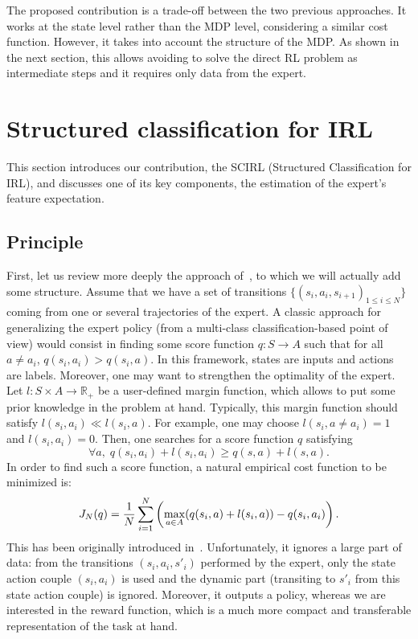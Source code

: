 \documentclass{article}
\begin{document}
The proposed contribution is a trade-off between the two previous
approaches. It works at the state level rather than the MDP level,
considering a similar cost function. However, it takes into account
the structure of the MDP. As shown in the next section, this allows
avoiding to solve the direct RL problem as intermediate steps and it
requires only data from the expert.

\section{Structured classification for IRL}
\label{sec:scirl}

This section introduces our contribution, the SCIRL (Structured
Classification for IRL), and discusses one of its key components,
the estimation of the expert's feature expectation.

\subsection{Principle}

First, let us review more deeply the approach
of~\cite{ratliff2007imitation}, to which we will actually add some
structure. Assume that we have a set of transitions
$\{(s_i,a_i,s_{i+1})_{1\leq i\leq N}\}$ coming from one or several
trajectories of the expert. A classic approach for generalizing the
expert policy (from a multi-class classification-based point of
view) would consist in finding some score function $q:S\rightarrow
A$ such that for all $a\neq a_i$, $q(s_i,a_i)>q(s_i,a)$. In this
framework, states are inputs and actions are labels. Moreover, one
may want to strengthen the optimality of the expert. Let $l:S\times
A\rightarrow\mathbb{R}_+$ be a user-defined margin function, which
allows to put some prior knowledge in the problem at hand.
Typically, this margin function should satisfy $l(s_i,a_i)\ll
l(s_i,a)$. For example, one may choose $l(s_i,a\neq a_i)=1$ and
$l(s_i,a_i)=0$. Then, one searches for a score function $q$
satisfying
\begin{equation}
\label{eq:inequalities_score}
  \forall a,\; q(s_i,a_i) + l(s_i,a_i) \geq q(s,a) + l(s,a).\nonumber
\end{equation}
In order to find such a score function, a natural empirical cost
function to be minimized is:
\begin{equation}
\label{Jdef.eqn} J_N(q) = {1\over N} \sum_{i=1}^N\left(\max_{a\in
A}(q(s_i,a) + l(s_i,a)) - q(s_i,a_i) \right).
\end{equation}
This has been originally introduced in~\cite{ratliff2007imitation}.
Unfortunately, it ignores a large part of data: from the transitions
$(s_i,a_i,s'_i)$ performed by the expert, only the state action
couple $(s_i,a_i)$ is used and the dynamic part (transiting to
$s'_i$ from this state action couple) is ignored.
%
Moreover, it outputs a policy, whereas we are interested in the
reward function, which is a much more compact and transferable
representation of the task at hand.
\end{document}
